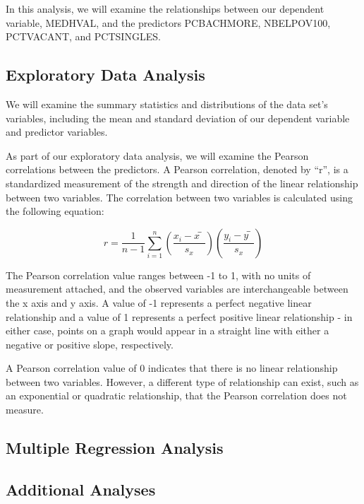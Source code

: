 \documentclass[
]{article}
\begin{document}
In this analysis, we will examine the relationships between our
dependent variable, MEDHVAL, and the predictors PCBACHMORE, NBELPOV100,
PCTVACANT, and PCTSINGLES.

\hypertarget{exploratory-data-analysis}{%
\subsection{Exploratory Data Analysis}\label{exploratory-data-analysis}}

We will examine the summary statistics and distributions of the data
set's variables, including the mean and standard deviation of our
dependent variable and predictor variables.

As part of our exploratory data analysis, we will examine the Pearson
correlations between the predictors. A Pearson correlation, denoted by
``r'', is a standardized measurement of the strength and direction of
the linear relationship between two variables. The correlation between
two variables is calculated using the following equation:

\[r=\frac{1}{n-1}\sum_{i=1}^{n}\left(\frac{x_i-x ̅}{s_x}\right)\left(\frac{y_i-y ̅}{s_x}\right)\]

The Pearson correlation value ranges between -1 to 1, with no units of
measurement attached, and the observed variables are interchangeable
between the x axis and y axis. A value of -1 represents a perfect
negative linear relationship and a value of 1 represents a perfect
positive linear relationship - in either case, points on a graph would
appear in a straight line with either a negative or positive slope,
respectively.

A Pearson correlation value of 0 indicates that there is no linear
relationship between two variables. However, a different type of
relationship can exist, such as an exponential or quadratic
relationship, that the Pearson correlation does not measure.

\hypertarget{multiple-regression-analysis}{%
\subsection{Multiple Regression
Analysis}\label{multiple-regression-analysis}}

\hypertarget{additional-analyses}{%
\subsection{Additional Analyses}\label{additional-analyses}}
\end{document}

